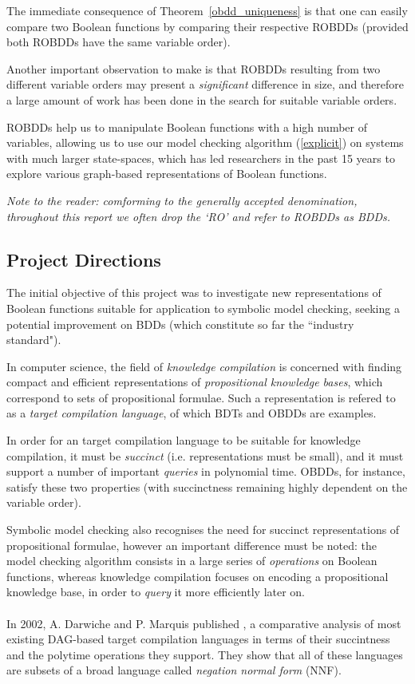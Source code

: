 \documentclass[11pt]{report}
\begin{document}
The immediate consequence of Theorem~\ref{obdd_uniqueness} is that one can easily compare two Boolean functions by comparing their respective ROBDDs (provided both ROBDDs have the same variable order). 

Another important observation to make is that ROBDDs resulting from two different variable orders may present a \textit{significant }difference in size, and therefore a large amount of work has been done in the search for suitable variable orders. 

ROBDDs help us to manipulate Boolean functions with a high number of variables, allowing us to use our model checking algorithm (\ref{explicit}) on systems with much larger state-spaces, which has led researchers in the past 15 years to explore various graph-based representations of Boolean functions.

\noindent\textit{Note to the reader: comforming to the generally accepted denomination, throughout this report we often drop the `RO' and refer to ROBDDs as BDDs.}

\subsection{Project Directions}

The initial objective of this project was to investigate new representations of Boolean functions suitable for application to symbolic model checking, seeking a potential improvement on BDDs (which constitute so far the ``industry standard").

In computer science, the field of \textit{knowledge compilation} is concerned with finding compact and efficient representations of \textit{propositional knowledge bases}, which correspond to sets of propositional formulae.
Such a representation is refered to as a \textit{target compilation language}, of which BDTs and OBDDs are examples. 
 
In order for an target compilation language to be suitable for knowledge compilation, it must be \textit{succinct} (i.e. representations must be small), and it must support a number of important \textit{queries} in polynomial time. OBDDs, for instance, satisfy these two properties (with succinctness remaining highly dependent on the variable order).

Symbolic model checking also recognises the need for succinct representations of propositional formulae, however an important difference must be noted: the model checking algorithm consists in a large series of \textit{operations} on Boolean functions, whereas knowledge compilation focuses on encoding a propositional knowledge base, in order to \textit{query} it more efficiently later on. 
\\\\
 In 2002, A. Darwiche and P. Marquis published \cite{compilation_map}, a comparative analysis of most existing DAG-based target compilation languages in terms of their succintness and the polytime operations they support. They show that all of these languages are subsets of a broad language called \textit{negation normal form} (NNF). 
\end{document}
